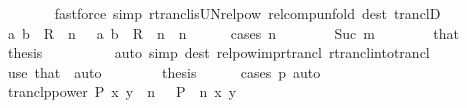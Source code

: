 \begin{isabellebody}
\ \ \ \ \ \ \isamarkupfalse%
\ {\isacharparenleft}{\kern0pt}fastforce\ simp{\isacharcolon}{\kern0pt}\ rtrancl{\isacharunderscore}{\kern0pt}is{\isacharunderscore}{\kern0pt}UN{\isacharunderscore}{\kern0pt}relpow\ relcomp{\isacharunderscore}{\kern0pt}unfold\ dest{\isacharcolon}{\kern0pt}\ tranclD{}{\isacharparenright}{\kern0pt}\isanewline
\ \ \ \ \isamarkupfalse%
\ {\isachardoublequoteopen}{\isacharparenleft}{\kern0pt}a{\isacharcomma}{\kern0pt}\ b{\isacharparenright}{\kern0pt}\ {\isasymin}\ R\isactrlsup {\isacharplus}{\kern0pt}{\isachardoublequoteclose}\ \ {\isachardoublequoteopen}n\ {\isachargreater}{\kern0pt}\ {}{\isachardoublequoteclose}\ {\isachardoublequoteopen}{\isacharparenleft}{\kern0pt}a{\isacharcomma}{\kern0pt}\ b{\isacharparenright}{\kern0pt}\ {\isasymin}\ R\ {\isacharcircum}{\kern0pt}{\isacharcircum}{\kern0pt}\ n{\isachardoublequoteclose}\ \ n\isanewline
\ \ \ \ \isamarkupfalse%
\ {\isacharparenleft}{\kern0pt}cases\ n{\isacharparenright}{\kern0pt}\isanewline
\ \ \ \ \ \ \isamarkupfalse%
\ {\isacharparenleft}{\kern0pt}Suc\ m{\isacharparenright}{\kern0pt}\isanewline
\ \ \ \ \ \ \isamarkupfalse%
\ that\ \isamarkupfalse%
\ {\isacharquery}{\kern0pt}thesis\isanewline
\ \ \ \ \ \ \ \ \isamarkupfalse%
\ {\isacharparenleft}{\kern0pt}auto\ simp{\isacharcolon}{\kern0pt}\ dest{\isacharcolon}{\kern0pt}\ relpow{\isacharunderscore}{\kern0pt}imp{\isacharunderscore}{\kern0pt}rtrancl\ rtrancl{\isacharunderscore}{\kern0pt}into{\isacharunderscore}{\kern0pt}trancl{}{\isacharparenright}{\kern0pt}\isanewline
\ \ \ \ \isamarkupfalse%
\ {\isacharparenleft}{\kern0pt}use\ that\ \ auto{\isacharparenright}{\kern0pt}\isanewline
\ \ \isamarkupfalse%
\isanewline
\ \ \isamarkupfalse%
\ \isamarkupfalse%
\ {\isacharquery}{\kern0pt}thesis\isanewline
\ \ \ \ \isamarkupfalse%
\ {\isacharparenleft}{\kern0pt}cases\ p{\isacharparenright}{\kern0pt}\ auto\isanewline
{}\isamarkupfalse%
%
\endisatagproof
{\isafoldproof}%
%
\isadelimproof
\isanewline
%
\endisadelimproof
\isanewline
{}\isamarkupfalse%
\ tranclp{\isacharunderscore}{\kern0pt}power{\isacharcolon}{\kern0pt}\ {\isachardoublequoteopen}{\isacharparenleft}{\kern0pt}P\isactrlsup {\isacharplus}{\kern0pt}\isactrlsup {\isacharplus}{\kern0pt}{\isacharparenright}{\kern0pt}\ x\ y\ {\isasymlongleftrightarrow}\ {\isacharparenleft}{\kern0pt}{\isasymexists}n\ {\isachargreater}{\kern0pt}\ {}{\isachardot}{\kern0pt}\ {\isacharparenleft}{\kern0pt}P\ {\isacharcircum}{\kern0pt}{\isacharcircum}{\kern0pt}\ n{\isacharparenright}{\kern0pt}\ x\ y{\isacharparenright}{\kern0pt}{\isachardoublequoteclose}\isanewline

\end{isabellebody}
